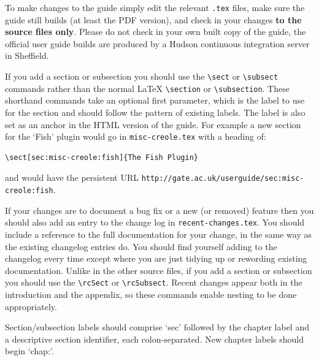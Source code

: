 
To make changes to the guide simply edit the relevant \texttt{.tex} files, make
sure the guide still builds (at least the PDF version), and check in your
changes \textbf{to the source files only}.  Please do not check in your own
built copy of the guide, the official user guide builds are produced by a
Hudson continuous integration server in Sheffield.

If you add a section or subsection you should use the \verb|\sect| or
\verb|\subsect| commands rather than the normal LaTeX \verb|\section| or
\verb|\subsection|.  These shorthand commands take an optional first parameter,
which is the label to use for the section and should follow the pattern of
existing labels.  The label is also set as an anchor in the HTML version of
the guide.  For example a new section for the `Fish' plugin would go in
\verb|misc-creole.tex| with a heading of:
\begin{small}\begin{verbatim}
\sect[sec:misc-creole:fish]{The Fish Plugin}
\end{verbatim}\end{small}
and would have the persistent URL
\verb|http://gate.ac.uk/userguide/sec:misc-creole:fish|.

If your changes are to document a bug fix or a new (or removed) feature then you
should also add an entry to the change log in \verb|recent-changes.tex|. You
should include a reference to the full documentation for your change, in the same
way as the existing changelog entries do. You should find yourself adding to the
changelog every time except where you are just tidying up or rewording existing
documentation. Unlike in the other source files, if you add a section or
subsection you should use the \verb|\rcSect| or \verb|\rcSubsect|. Recent
changes appear both in the introduction and the appendix, so these commands
enable nesting to be done appropriately.

Section/subsection labels should comprise `sec' followed by the chapter label and
a descriptive section identifier, each colon-separated. New chapter labels should
begin `chap:'.

